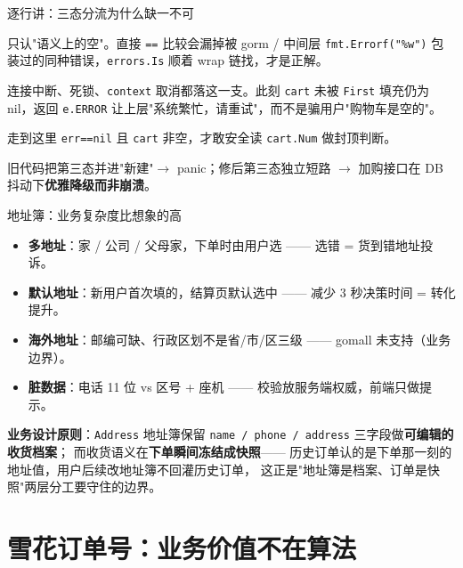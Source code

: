 \documentclass[aspectratio=169,11pt]{beamer}
\begin{document}
\begin{frame}[shrink]{逐行讲：三态分流为什么缺一不可}
\begin{description}\setlength{\itemsep}{0.5mm}
  \item[\texttt{errors.Is(ErrRecordNotFound)}] 只认"语义上的空"。直接 \texttt{==} 比较会漏掉被 gorm / 中间层 \texttt{fmt.Errorf("\%w")} 包装过的同种错误，\texttt{errors.Is} 顺着 wrap 链找，才是正解。
  \item[\texttt{if err != nil} 短路] 连接中断、死锁、\texttt{context} 取消都落这一支。此刻 \texttt{cart} 未被 \texttt{First} 填充仍为 nil，返回 \texttt{e.ERROR} 让上层"系统繁忙，请重试"，而不是骗用户"购物车是空的"。
  \item[命中分支] 走到这里 \texttt{err==nil} 且 \texttt{cart} 非空，才敢安全读 \texttt{cart.Num} 做封顶判断。
  \item[失败模式对比] 旧代码把第三态并进"新建"$\to$ panic；修后第三态独立短路 $\to$ 加购接口在 DB 抖动下\textbf{优雅降级而非崩溃}。
\end{description}
\vspace{1mm}
\end{frame}

\begin{frame}[shrink]{地址簿：业务复杂度比想象的高}
\begin{itemize}
  \item \textbf{多地址}：家 / 公司 / 父母家，下单时由用户选 —— 选错 = 货到错地址投诉。
  \item \textbf{默认地址}：新用户首次填的，结算页默认选中 —— 减少 3 秒决策时间 = 转化提升。
  \item \textbf{海外地址}：邮编可缺、行政区划不是省/市/区三级 —— gomall 未支持（业务边界）。
  \item \textbf{脏数据}：电话 11 位 vs 区号 + 座机 —— 校验放服务端权威，前端只做提示。
\end{itemize}
\vspace{2mm}
\textbf{业务设计原则}：\texttt{Address} 地址簿保留 \texttt{name / phone / address} 三字段做\textbf{可编辑的收货档案}；
而收货语义在\textbf{下单瞬间冻结成快照}—— 历史订单认的是下单那一刻的地址值，用户后续改地址簿不回灌历史订单，
这正是"地址簿是档案、订单是快照"两层分工要守住的边界。
\end{frame}

\section{雪花订单号：业务价值不在算法}
\end{document}
